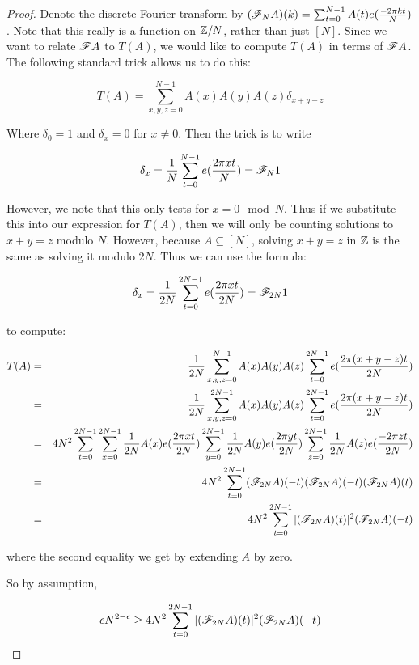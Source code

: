 \documentclass{report}
\theoremstyle{remark}
\numberwithin{equation}{section}
\begin{document}
\begin{proof}
  Denote the discrete Fourier transform by
  $(\mathscr{F}_N A)(k) = \sum_{t=0}^{N-1} A(t) e(\frac{-2\pi k t}{N})$.
  Note that this really is a function on $\mathbb{Z}/N$, rather than just
  $[N]$.  Since we want to relate $\mathscr{F} A$ to $T(A)$, we would like to
  compute $T(A)$ in terms of $\mathscr{F} A$.  The following standard trick
  allows us to do this: 

  \[T(A) = \sum_{x, y, z = 0}^{N-1} A(x)A(y)A(z)\delta_{x+y-z}\]

  Where $\delta_0 = 1$ and $\delta_x = 0$ for $x \neq 0$.  Then the
  trick is to write 

  \[\delta_x = \frac{1}{N} \sum_{t=0}^{N-1} e(\frac{2\pi x t}{N}) = \mathscr{F}_N 1\]

  However, we note that this only tests for $x = 0 \mod{N}$.  Thus if
  we substitute this into our expression for $T(A)$, then we will only
  be counting solutions to $x+y=z$ modulo $N$.  However, because
  $A \subseteq [N]$, solving $x+y=z$ in $\mathbb{Z}$ is the same as solving it
  modulo $2N$.  Thus we can use the formula:

  \[\delta_x = \frac{1}{2N} \sum_{t=0}^{2N-1} e(\frac{2\pi x t}{2N}) = \mathscr{F}_{2N} 1\]

  to compute: 

  \begin{eqnarray*}
    T(A) &=& \frac{1}{2N}\sum_{x, y, z = 0}^{N-1} A(x)A(y)A(z)\sum_{t=0}^{2N-1}
             e(\frac{2\pi (x+y-z) t}{2N})\\
         &=& \frac{1}{2N}\sum_{x, y, z = 0}^{2N-1} A(x)A(y)A(z)\sum_{t=0}^{2N-1}
             e(\frac{2\pi (x+y-z) t}{2N})\\
         &=& 4N^2 \sum_{t=0}^{2N-1}
             \sum_{x=0}^{2N-1} \frac{1}{2N} A(x)e(\frac{2\pi x t}{2N}) 
             \sum_{y=0}^{2N-1} \frac{1}{2N} A(y)e(\frac{2\pi y t}{2N}) 
             \sum_{z=0}^{2N-1} \frac{1}{2N} A(z)e(\frac{-2\pi z t}{2N})\\
         &=& 4 N^2 \sum_{t=0}^{2N-1} (\mathscr{F}_{2N}A)(-t)(\mathscr{F}_{2N}A)(-t)(\mathscr{F}_{2N}A)(t)\\
         &=& 4 N^2 \sum_{t=0}^{2N-1} |(\mathscr{F}_{2N}A)(t)|^2(\mathscr{F}_{2N}A)(-t)
  \end{eqnarray*}
  
  where the second equality we get by extending $A$ by zero.  
  
  So by assumption, 

  \[cN^{2-\epsilon} \geq 4 N^2 \sum_{t=0}^{2N-1} |(\mathscr{F}_{2N}A)(t)|^2(\mathscr{F}_{2N}A)(-t)\]


\end{proof}
\end{document}
